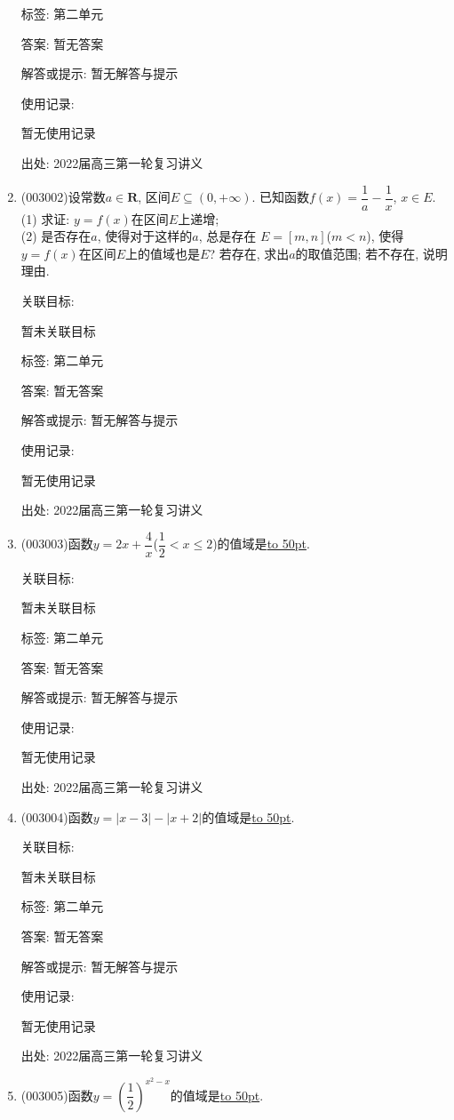 \documentclass[10pt,a4paper]{article}
\newcommand{\blank}[1]{\underline{\hbox to #1pt{}}}
\begin{document}
\begin{enumerate}[1.]
标签: 第二单元

答案: 暂无答案

解答或提示: 暂无解答与提示

使用记录:

暂无使用记录


出处: 2022届高三第一轮复习讲义
\item { (003002)}设常数$a\in \mathbf{R}$, 区间$E\subseteq (0,+\infty)$. 已知函数$f(x)=\dfrac 1a-\dfrac 1x$, $x\in E$.\\
(1) 求证: $y=f(x)$在区间$E$上递增;\\
(2) 是否存在$a$, 使得对于这样的$a$, 总是存在 $E=[m,n]$($m<n$), 使得$y=f(x)$在区间$E$上的值域也是$E$? 若存在, 求出$a$的取值范围; 若不存在, 说明理由.


关联目标:

暂未关联目标



标签: 第二单元

答案: 暂无答案

解答或提示: 暂无解答与提示

使用记录:

暂无使用记录


出处: 2022届高三第一轮复习讲义
\item { (003003)}函数$y=2x+\dfrac 4x$($\dfrac 12<x\le 2$)的值域是\blank{50}.


关联目标:

暂未关联目标



标签: 第二单元

答案: 暂无答案

解答或提示: 暂无解答与提示

使用记录:

暂无使用记录


出处: 2022届高三第一轮复习讲义
\item { (003004)}函数$y=|x-3|-|x+2|$的值域是\blank{50}.


关联目标:

暂未关联目标



标签: 第二单元

答案: 暂无答案

解答或提示: 暂无解答与提示

使用记录:

暂无使用记录


出处: 2022届高三第一轮复习讲义
\item { (003005)}函数$y=(\dfrac 12)^{x^2-x}$的值域是\blank{50}.



\end{enumerate}
\end{document}
